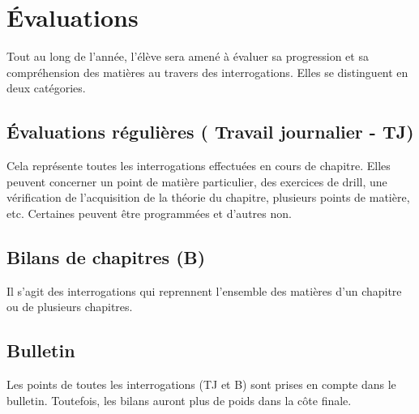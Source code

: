 \documentclass[parskip=half-, numbers=enddot]{scrartcl}
\begin{document}
\section{Évaluations}

Tout au long de l'année, l'élève sera amené à évaluer sa progression et
sa compréhension des matières au travers des interrogations. Elles se
distinguent en deux catégories.

\subsection{Évaluations régulières ( Travail journalier - TJ)}

Cela représente toutes les interrogations effectuées en cours de
chapitre. Elles peuvent concerner un point de matière particulier, des
exercices de drill, une vérification de l'acquisition de la théorie du chapitre, plusieurs points de matière, etc. Certaines peuvent être
programmées et d'autres non.

\subsection{Bilans de chapitres (B)}

Il s'agit des interrogations qui reprennent l'ensemble des matières d'un chapitre ou de plusieurs chapitres.

\subsection{Bulletin}
Les points de toutes les interrogations (TJ et B) sont prises en compte dans le bulletin. Toutefois, les bilans auront plus de poids dans la côte finale.


\end{document}
